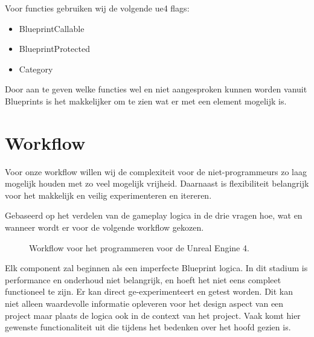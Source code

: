 Voor functies gebruiken wij de volgende \gls{ue4} flags:

\begin{itemize}
	\item BlueprintCallable
	\item BlueprintProtected
	\item Category
\end{itemize}

Door aan te geven welke functies wel en niet aangesproken kunnen worden vanuit Blueprints is het makkelijker om te zien wat er met een element mogelijk is.

\section{Workflow}
\label{sec:workflow}
Voor onze workflow willen wij de complexiteit voor de niet-programmeurs zo laag mogelijk houden met zo veel mogelijk vrijheid. Daarnaast is flexibiliteit belangrijk voor het makkelijk en veilig experimenteren en itereren.

Gebaseerd op het verdelen van de gameplay logica in de drie vragen hoe, wat en wanneer wordt er voor de volgende workflow gekozen.
    
\begin{figure}[H]
	\centering
	\caption{Workflow voor het programmeren voor de Unreal Engine 4.}
	\label{fig:workflow}
\end{figure}

Elk component zal beginnen als een imperfecte Blueprint logica. In dit stadium is performance en onderhoud niet belangrijk, en hoeft het niet eens compleet functioneel te zijn. Er kan direct ge-experimenteert en getest worden. Dit kan niet alleen waardevolle informatie opleveren voor het design aspect van een project maar plaats de logica ook in de context van het project. Vaak komt hier gewenste functionaliteit uit die tijdens het bedenken over het hoofd gezien is.

